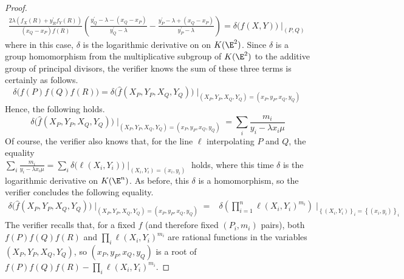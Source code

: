 \documentclass[11pt,letterpaper]{article}
\theoremstyle{definition}
\newcommand{\6}{\mathbf}
\newcommand{\7}{\mathcal}
\begin{document}
\begin{proof}
\begin{align}
\frac{2\lambda(f_X(R) + y^\prime_R f_Y(R))}{(x_Q-x_P) f(R)}\left(\frac{y_Q^\prime - \lambda - (x_Q-x_P)}{y_Q^\prime - \lambda} - \frac{y_P^\prime - \lambda + (x_Q-x_P)}{y_P^\prime - \lambda}\right) = \delta\big(f(X,Y)\big)\mid_{(P,Q)}
\end{align}
where in this case, $\delta$ is the logarithmic derivative on on $K(\E^2)$. Since $\delta$ is a group homomorphism from the multiplicative subgroup of $K(\E^2)$ to the additive group of principal divisors, the verifier knows the sum of these three terms is certainly as follows.
\[\delta\big(f(P)f(Q)f(R)\big) = \delta\big(\widehat{f}(X_P,Y_P,X_Q,Y_Q)\big)\mid_{(X_P,Y_P,X_Q,Y_Q)=(x_P,y_P,x_Q,y_Q)}\] Hence, the following holds.
$$\delta\big(\widehat{f}(X_P,Y_P,X_Q,Y_Q)\big)\mid_{(X_P,Y_P,X_Q,Y_Q)=(x_P,y_P,x_Q,y_Q)} = \sum_i \frac{m_i}{y_i-\lambda x_i \mu}$$
Of course, the verifier also knows that, for the line $\ell$ interpolating $P$ and $Q$, the equality \\
$\sum_i \frac{m_i}{y_i-\lambda x_i \mu} = \sum_i \delta\big(\ell(X_i,Y_i)\big)\mid_{(X_i,Y_i)=(x_i,y_i)}$ holds, where this time $\delta$ is the logarithmic derivative on $K(\E^n)$. As before, this $\delta$ is a homomorphism, so the verifier concludes the following equality.
\begin{align}
\delta\big(\widehat{f}(X_P,Y_P,X_Q,Y_Q)\big)\mid_{(X_P,Y_P,X_Q,Y_Q)=(x_P,y_P,x_Q,y_Q)} =& \delta\left(\prod_{i=1}^{n} \ell(X_i,Y_i)^{m_i}\right)\mid_{\left\{(X_i,Y_i)\right\}_i=\left\{(x_i,y_i)\right\}_i} \label{verfequality}
\end{align}
The verifier recalls that, for a fixed $f$ (and therefore fixed $(P_i, m_i)$ pairs), both $f(P)f(Q)f(R)$ and $\prod_i \ell(X_i,Y_i)^{m_i}$ are rational functions in the variables $(X_P, Y_P, X_Q, Y_Q)$, so $(x_P, y_P, x_Q, y_Q)$ is a root of $f(P)f(Q)f(R) - \prod_i \ell(X_i,Y_i)^{m_i}$. %

\end{proof}
\end{document}
